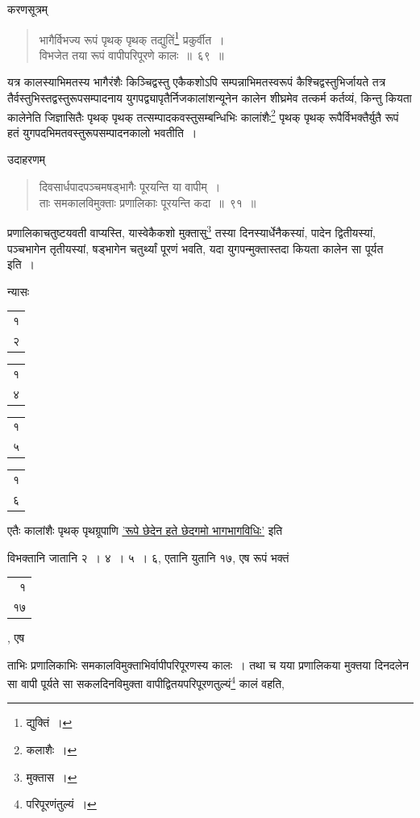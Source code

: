 \documentclass[10pt, openany]{book}
\begin{document}
{{{करणसूत्रम्\textemdash}

 \label{69}
\begin{quote}
    
{\bs भागैर्विभज्य रूपं पृथक् पृथक् तद्युतिं\renewcommand{\thefootnote}{\s ८}\footnote{\s *द्युक्तिं~।} प्रकुर्वीत~। \\
 विभजेत तया रूपं वापीपरिपूरणे कालः~॥~६९~॥}\end{quote}

{यत्र कालस्याभिमतस्य भागैरंशैः किञ्चिद्वस्तु एकैकशोऽपि
सम्पन्नाभिमतस्वरूपं}
{कैश्चिद्वस्तुभिर्जायते तत्र तैर्वस्तुभिस्तद्वस्तुरूपसम्पादनाय
युगपद्व्यापृतैर्निजकालांशन्यूनेन कालेन}
{शीघ्रमेव तत्कर्म कर्तव्यं, किन्तु कियता कालेनेति जिज्ञासितैः पृथक्
पृथक् तत्सम्पादकवस्तुसम्बन्धिभिः कालांशैः\renewcommand{\thefootnote}{\s ९}\footnote{\s कलाशैः~।} पृथक् पृथक् रूपैर्विभक्तैर्युतै रूपं हतं
युगपदभिमतवस्तुरूपसम्पादनकालो भवतीति~।}
\vspace{-1mm}

{उदाहरणम्\textemdash}

\begin{quote}

{\eg दिवसार्धपादपञ्चमषड्भागैः पूरयन्ति या वापीम्~। \\
 ताः समकालविमुक्ताः प्रणालिकाः पूरयन्ति कदा~॥~९१~॥}
 \end{quote}

{प्रणालिकाचतुष्टयवती वाप्यस्ति, यास्वेकैकशो मुक्तासु\renewcommand{\thefootnote}{\s १०}\footnote{\s मुक्तास~।} तस्या
दिनस्यार्धेनैकस्यां,}
{पादेन द्वितीयस्यां, पञ्चभागेन तृतीयस्यां, षड्भागेन चतुर्थ्यां पूरणं
भवति, यदा युगपन्मुक्तास्तदा कियता कालेन सा पूर्यत इति~।}
\vspace{3mm}

न्यासः\textendash \hspace{2mm} \begin{tabular}{r|}१ \\ २  \end{tabular}\begin{tabular}{r|}  १ \\  ४  \end{tabular}\begin{tabular}{r|}१  \\ ५  \end{tabular}\begin{tabular}{r} १\\  ६ \end{tabular}
\vspace{3mm}

{एतैः कालांशैः पृथक् पृथग्रूपाणि \hyperref[38]{'रूपे छेदेन हते छेदगमो भागभागविधिः'} इति}
{विभक्तानि जातानि २~। ४~। ५~। ६, एतानि युतानि १७, एष रूपं भक्तं\begin{tabular}{r} १\\ १७ \end{tabular}, एष}
{ताभिः प्रणालिकाभिः समकालविमुक्ताभिर्वापीपरिपूरणस्य कालः~। तथा च यया
प्रणालिकया}
{मुक्तया दिनदलेन सा वापी पूर्यते सा सकलदिनविमुक्ता
वापीद्वितयपरिपूरणतुल्यं\renewcommand{\thefootnote}{\s ११}\footnote{\s परिपूरणंतुल्यं~।} कालं वहति,}

}}
\end{document}
